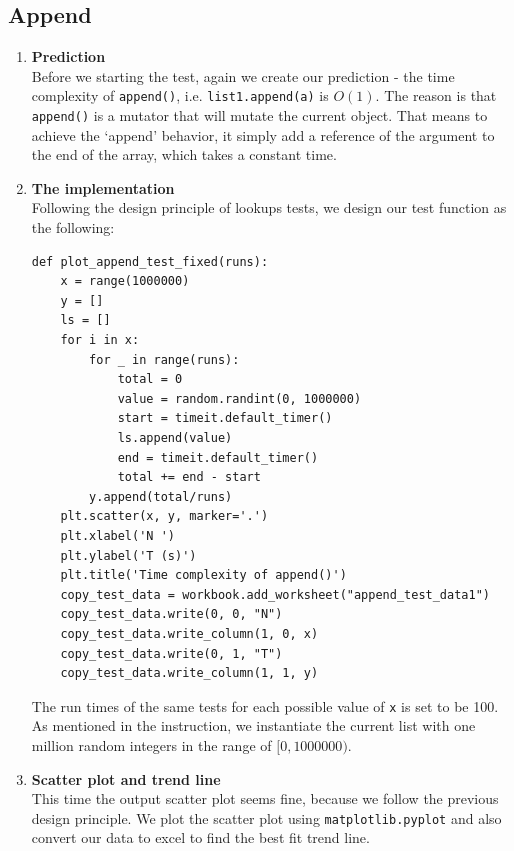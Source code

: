 \documentclass[12pt]{article}
\begin{document}
\subsection{Append}
\begin{enumerate}[(1)]
\item \textbf{Prediction}\\
Before we starting the test, again we create our prediction \-- the time complexity of \verb|append()|, i.e. \verb|list1.append(a)| is \(O(1)\). The reason is that \verb|append()| is a mutator that will mutate the current object. That means to achieve the `append' behavior, it simply add a reference of the argument to the end of the array, which takes a constant time.
\item \textbf{The implementation}\\
Following the design principle of lookups tests, we design our test function as the following:
\lstset{language=Python, basicstyle=\ttfamily\small, breaklines=true, showspaces=false,
  showstringspaces=false, breakatwhitespace=true}
\begin{lstlisting}
def plot_append_test_fixed(runs):
    x = range(1000000)
    y = []
    ls = []
    for i in x:
        for _ in range(runs):
            total = 0
            value = random.randint(0, 1000000)
            start = timeit.default_timer()
            ls.append(value)
            end = timeit.default_timer()
            total += end - start
        y.append(total/runs)
    plt.scatter(x, y, marker='.')
    plt.xlabel('N ')
    plt.ylabel('T (s)')
    plt.title('Time complexity of append()')
    copy_test_data = workbook.add_worksheet("append_test_data1")
    copy_test_data.write(0, 0, "N")
    copy_test_data.write_column(1, 0, x)
    copy_test_data.write(0, 1, "T")
    copy_test_data.write_column(1, 1, y)
\end{lstlisting}
The run times of the same tests for each possible value of \verb|x| is set to be 100. As mentioned in the instruction, we instantiate the current list with one million random integers in the range of \([0, 1000000)\).

\item \textbf{Scatter plot and trend line}\\
This time the output scatter plot seems fine, because we follow the previous design principle. We plot the scatter plot using \verb|matplotlib.pyplot| and also convert our data to excel to find the best fit trend line.\\


\end{enumerate}
\end{document}
